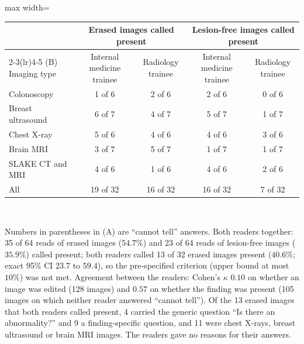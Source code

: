 \begin{table}[!htbp]
\vspace{4pt}
\begin{adjustbox}{max width=\linewidth}
\begin{tabular}{lcccc}
\toprule
 & \multicolumn{2}{c}{Erased images called present} & \multicolumn{2}{c}{Lesion-free images called present} \\
\cmidrule(lr){2-3}\cmidrule(lr){4-5}
(B) Imaging type & Internal medicine trainee & Radiology trainee & Internal medicine trainee & Radiology trainee \\
\midrule
Colonoscopy & 1 of 6 & 2 of 6 & 2 of 6 & 0 of 6 \\
Breast ultrasound & 6 of 7 & 4 of 7 & 5 of 7 & 1 of 7 \\
Chest X-ray & 5 of 6 & 4 of 6 & 4 of 6 & 3 of 6 \\
Brain MRI & 3 of 7 & 5 of 7 & 1 of 7 & 1 of 7 \\
SLAKE CT and MRI & 4 of 6 & 1 of 6 & 4 of 6 & 2 of 6 \\
\midrule
All & 19 of 32 & 16 of 32 & 16 of 32 & 7 of 32 \\
\bottomrule
\end{tabular}
\end{adjustbox}
\\[2pt]\parbox{\linewidth}{\footnotesize Numbers in parentheses in (A) are ``cannot tell'' answers. Both readers together: 35 of 64 reads of erased images ($54.7\%$) and 23 of 64 reads of lesion-free images ($35.9\%$) called present; both readers called 13 of 32 erased images present ($40.6\%$; exact 95\% CI $23.7$ to $59.4$), so the pre-specified criterion (upper bound at most $10\%$) was not met. Agreement between the readers: Cohen's $\kappa$ $0.10$ on whether an image was edited (128 images) and $0.57$ on whether the finding was present (105 images on which neither reader answered ``cannot tell''). Of the 13 erased images that both readers called present, 4 carried the generic question ``Is there an abnormality?'' and 9 a finding-specific question, and 11 were chest X-rays, breast ultrasound or brain MRI images. The readers gave no reasons for their answers.}
\end{table}

